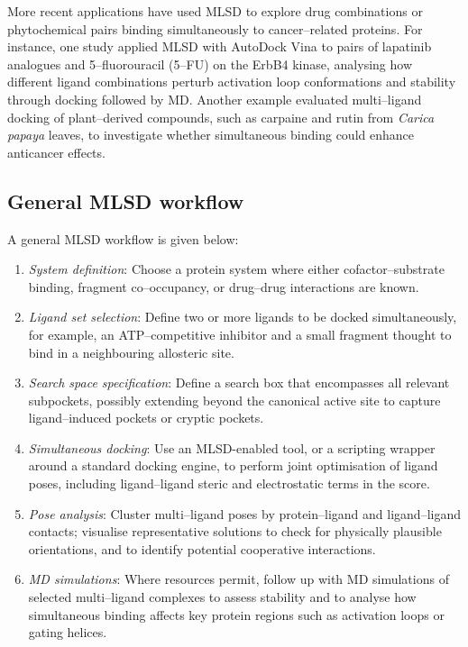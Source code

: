 \documentclass[12pt]{article}
\begin{document}
More recent applications have used MLSD to explore drug combinations or phytochemical pairs binding simultaneously to cancer–related proteins. For instance, one study applied MLSD with AutoDock Vina to pairs of lapatinib analogues and 5–fluorouracil (5–FU) on the ErbB4 kinase\cite{CH14_ErbB4MLSD2024}, analysing how different ligand combinations perturb activation loop conformations and stability through docking followed by MD.
Another example evaluated multi–ligand docking of plant–derived compounds\cite{CH14_PapayaMultiLigand2025}, such as carpaine and rutin from \emph{Carica papaya} leaves, to investigate whether simultaneous binding could enhance anticancer effects. 

\subsection{General MLSD workflow}

A general MLSD workflow is given below:

\begin{enumerate}
  \item \emph{System definition}: Choose a protein system where either cofactor–substrate binding, fragment co–occupancy, or drug–drug interactions are known.  
  \item \emph{Ligand set selection}: Define two or more ligands to be docked simultaneously, for example, an ATP–competitive inhibitor and a small fragment thought to bind in a neighbouring allosteric site.  
  \item \emph{Search space specification}: Define a search box that encompasses all relevant subpockets, possibly extending beyond the canonical active site to capture ligand–induced pockets or cryptic pockets.  
  \item \emph{Simultaneous docking}: Use an MLSD-enabled tool, or a scripting wrapper around a standard docking engine, to perform joint optimisation of ligand poses, including ligand–ligand steric and electrostatic terms in the score.  
  \item \emph{Pose analysis}: Cluster multi–ligand poses by protein–ligand and ligand–ligand contacts; visualise representative solutions to check for physically plausible orientations, and to identify potential cooperative interactions.  
  \item \emph{MD simulations}: Where resources permit, follow up with MD simulations of selected multi–ligand complexes to assess stability and to analyse how simultaneous binding affects key protein regions such as activation loops or gating helices.
\end{enumerate}
\end{document}
